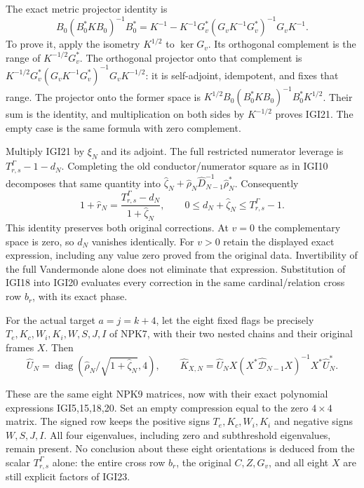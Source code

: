 \documentclass[11pt,a4paper]{article}
\begin{document}
The exact metric projector identity is
\[
 B_0(B_0^*KB_0)^{-1}B_0^*
 =K^{-1}-K^{-1}G_v^*(G_vK^{-1}G_v^*)^{-1}G_vK^{-1}.
                                                               \tag{IGI21}
\]
To prove it, apply the isometry $K^{1/2}$ to $\ker G_v$.
Its orthogonal complement is the range of $K^{-1/2}G_v^*$.
The orthogonal projector onto that complement is
$K^{-1/2}G_v^*(G_vK^{-1}G_v^*)^{-1}G_vK^{-1/2}$:
it is self-adjoint, idempotent, and fixes that range. The projector
onto the former space is
$K^{1/2}B_0(B_0^*KB_0)^{-1}B_0^*K^{1/2}$. Their sum is the
identity, and multiplication on both sides by $K^{-1/2}$ proves
IGI21. The empty case is the same formula with zero complement.

Multiply IGI21 by $\xi_N$ and its adjoint. The full restricted
numerator leverage is $T_{r,s}^\Gamma-1-d_N$. Completing the
old conductor/numerator square as in IGI10 decomposes that same
quantity into
$\widehat\zeta_N+\widehat\rho_N\widehat D_{N-1}^{-1}
\widehat\rho_N^*$. Consequently
\[
\boxed{\quad
 1+\widehat r_N=
       \frac{T_{r,s}^\Gamma-d_N}{1+\widehat\zeta_N},
 \qquad
 0\le d_N+\widehat\zeta_N\le T_{r,s}^\Gamma-1.
 \quad}                                                        \tag{IGI22}
\]
This identity preserves both original corrections. At $v=0$ the
complementary space is zero, so $d_N$ vanishes identically. For
$v>0$ retain the displayed exact expression, including any value
zero proved from the original data. Invertibility of the full
Vandermonde alone does not eliminate that expression.
Substitution of IGI18 into IGI20 evaluates every correction in
the same cardinal/relation cross row $b_r$, with its exact phase.

For the actual target $a=j=k+4$, let the eight fixed flags be
precisely $T_e,K_c,W_i,K_i,W,S,J,I$ of NPK7, with their two
nested chains and their original frames $X$. Then
\[
 \widehat U_N=\operatorname{diag}
       (\widehat\rho_N/\sqrt{1+\widehat\zeta_N},4),\qquad
 \widehat K_{X,N}=\widehat U_NX
 (X^*\widehat{\mathcal D}_{N-1}X)^{-1}X^*\widehat U_N^*.
                                                               \tag{IGI23}
\]
\begingroup\raggedright
These are the same eight NPK9 matrices, now with their exact
polynomial expressions IGI5,15,18,20. Set an empty compression
equal to the zero $4\times4$ matrix. The signed row keeps the
positive signs $T_e,K_c,W_i,K_i$ and negative signs $W,S,J,I$.
All four eigenvalues, including zero and subthreshold eigenvalues,
remain present. No conclusion about these eight orientations is
deduced from the scalar $T_{r,s}^\Gamma$ alone: the entire cross
row $b_r$, the original $C,Z,G_v$, and all eight $X$ are still
explicit factors of IGI23.\par\endgroup
\end{document}
